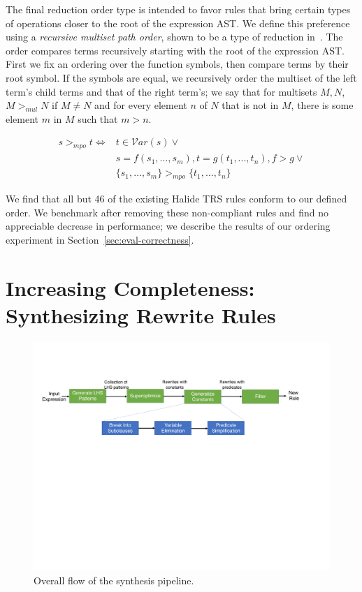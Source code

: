 \documentclass[sigplan,10pt,review,anonymous]{acmart}\settopmatter{printfolios=true,printccs=false,printacmref=false}
\newcommand{\NumOrderingProblems}{{\color{red} 46}\xspace}
\begin{document}
The final reduction order type is intended to favor rules that bring certain
types of operations closer to the root of the expression AST. 
We define this preference using a \emph{recursive multiset path order}, shown to be a type of reduction in~\cite{baader1999term}. The order compares terms recursively starting with the root of the expression AST. First we
fix an ordering over the function symbols, then compare terms by their root
symbol. If the symbols are equal, we recursively order the multiset of the left
term's child terms and that of the right term's; we say that for multisets $M,
N$, $M >_{mul} N$ if $M \neq N$ and for every element $n$ of $N$ that is not in
$M$, there is some element $m$ in $M$ such that $m > n$.

\begin{equation*}
\begin{split}
s >_{mpo} t \iff & t \in \mathcal{V}ar(s) \vee \\
              &  s = f(s_1,\dots,s_m), t = g(t_1,...,t_n), f > g \vee \\
               & \{s_1, \dots, s_m\} >_{mpo} \{t_1,\dots,t_n\}
\end{split}
\end{equation*}

We find that all but \NumOrderingProblems of the existing Halide TRS rules conform to our defined order. We benchmark after removing these non-compliant rules and find no appreciable decrease in performance; we describe the results of our ordering experiment in Section~\ref{sec:eval-correctness}.




\section{Increasing Completeness: Synthesizing Rewrite Rules}
\begin{figure}
\includegraphics[width=1.9\columnwidth]{figures/synthesis-flow.pdf}
\caption{Overall flow of the synthesis pipeline.}
\label{fig:synthesis-flow}
\end{figure}
\end{document}
